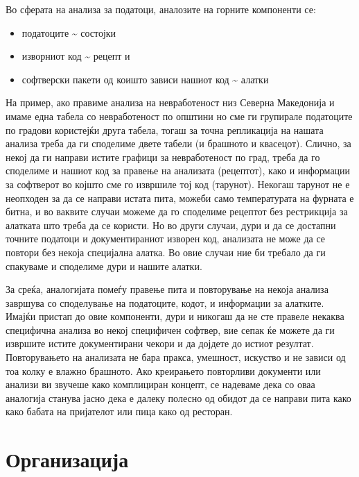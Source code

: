 \documentclass[
]{book}
\providecommand{\tightlist}{%
  \setlength{\itemsep}{0pt}\setlength{\parskip}{0pt}}
\begin{document}
Во сферата на анализа за податоци, аналозите на горните компоненти се:

\begin{itemize}
\tightlist
\item
  податоците \textasciitilde{} состојки\\
\item
  изворниот код \textasciitilde{} рецепт и\\
\item
  софтверски пакети од коишто зависи нашиот код \textasciitilde{} алатки
\end{itemize}

На пример, ако правиме анализа на невработеност низ Северна Македонија и имаме една табела со невработеност по општини но сме ги групирале податоците по градови користејќи друга табела, тогаш за точна репликација на нашата анализа треба да ги споделиме двете табели (и брашното и квасецот). Слично, за некој да ги направи истите графици за невработеност по град, треба да го споделиме и нашиот код за правење на анализата (рецептот), како и информации за софтверот во којшто сме го извршиле тој код (тарунот). Некогаш тарунот не е неопходен за да се направи истата пита, можеби само температурата на фурната е битна, и во ваквите случаи можеме да го споделиме рецептот без рестрикција за алатката што треба да се користи. Но во други случаи, дури и да се достапни точните податоци и документираниот изворен код, анализата не може да се повтори без некоја специјална алатка. Во овие случаи ние би требало да ги спакуваме и споделиме дури и нашите алатки.

За среќа, аналогијата помеѓу правење пита и повторување на некоја анализа завршува со споделување на податоците, кодот, и информации за алатките. Имајќи пристап до овие компоненти, дури и никогаш да не сте правеле некаква специфична анализа во некој специфичен софтвер, вие сепак ќе можете да ги извршите истите документирани чекори и да дојдете до истиот резултат. Повторувањето на анализата не бара пракса, умешност, искуство и не зависи од тоа колку е влажно брашното. Ако креирањето повторливи документи или анализи ви звучеше како комплициран концепт, се надеваме дека со оваа аналогија станува јасно дека е далеку полесно од обидот да се направи пита како како бабата на пријателот или пица како од ресторан.

\hypertarget{organ}{%
\section{Организација}\label{organ}}
\end{document}
